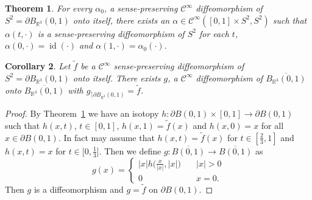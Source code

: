 \documentclass[12pt,a4paper]{amsart}
\theoremstyle{plain}
\newtheorem{thm}{Theorem}[section]
\newtheorem{corollary}[thm]{Corollary}
\theoremstyle{definition}
\numberwithin{equation}{section}
\def\er{\mathbb R}
\def\id{\operatorname{id}}
\begin{document}
	\begin{thm}\label{Smale}
		For every $\alpha_0$, a sense-preserving  $\mathcal{C}^{\infty}$ diffeomorphism of $S^2 = \partial B_{\er^3}(0,1)$ onto itself, there exists an $\alpha\in \mathcal{C}^{\infty}([0,1]\times S^2,S^2)$ such that $\alpha(t,\cdot)$ is a sense-preserving diffeomorphism of $S^2$ for each $t$, $\alpha(0,\cdot) = \id(\cdot)$ and $\alpha(1,\cdot) = \alpha_0(\cdot)$.
	\end{thm}
	\begin{corollary}\label{VertThm}
		Let $\tilde{f}$ be a $\mathcal{C}^{\infty}$ sense-preserving diffeomorphism of $S^2 = \partial B_{\er^3}(0,1)$ onto itself. There exists $g$, a $\mathcal{C}^\infty$ diffeomorphism of $\overline{B_{\er^3}(0,1)}$ onto $\overline{B_{\er^3}(0,1)}$ with $g_{\rceil \partial B_{\er^3}(0,1)} = \tilde{f}$.
	\end{corollary}
	\begin{proof}
		By Theorem~\ref{Smale} we have an isotopy $h:\partial B(0,1)\times [0,1] \to \partial B(0,1)$ such that $h(x,t)$, $t\in [0,1]$, $h(x,1) = \tilde f(x)$ and $h(x,0) = x$ for all $x\in \partial B(0,1)$. In fact may assume that $h(x,t) =  \tilde f(x)$ for $t\in [\tfrac{2}{3},1]$ and $h(x,t) =  x$ for $t\in [0,\tfrac{1}{3}$]. Then we define $g:\overline{B(0,1)} \to \overline{B(0,1)}$ as 
		$$
		g(x) = \begin{cases}
			|x|h\Big(\frac{x}{|x|}, |x|\Big) \quad & |x|>0\\
			0 &x=0.
		\end{cases}
		$$
		Then $g$ is a diffeomorphism and $g = \tilde{f}$ on $\partial B(0,1)$.
	\end{proof}
	
\end{document}
